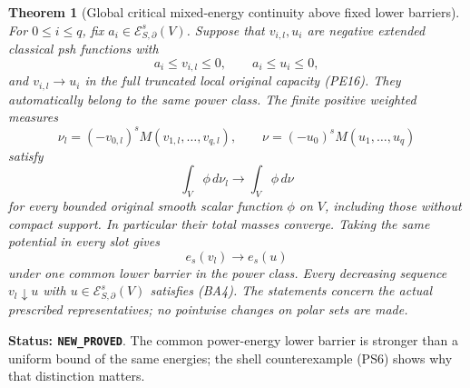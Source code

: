 \documentclass[11pt,a4paper]{article}
\numberwithin{equation}{section}
\newtheorem{theorem}{Theorem}[section]
\theoremstyle{definition}
\theoremstyle{remark}
\begin{document}
\begin{theorem}[Global critical mixed-energy continuity above fixed lower barriers]
\label{thm:r11-critical-energy-barrier-continuity}
For $0\leq i\leq q$, fix
$a_i\in\mathcal E^s_{S,\partial}(V)$. Suppose that
$v_{i,l},u_i$ are negative extended classical psh functions with
\[
                    a_i\leq v_{i,l}\leq0,
                    \qquad a_i\leq u_i\leq0,
 \tag{BA2}
\]
and $v_{i,l}\to u_i$ in the full truncated local original
capacity (PE16). They automatically belong to the same power
class. The finite positive weighted measures
\[
 \nu_l=(-v_{0,l})^s M(v_{1,l},\ldots,v_{q,l}),\qquad
 \nu=(-u_0)^s M(u_1,\ldots,u_q)
\]
satisfy
\[
                         \int_V\phi\,d\nu_l
                              \longrightarrow\int_V\phi\,d\nu
 \tag{BA3}
\]
for every bounded original smooth scalar function $\phi$ on $V$,
including those without compact support. In particular their
total masses converge. Taking the same potential in every slot
gives
\[
                              e_s(v_l)\longrightarrow e_s(u)
 \tag{BA4}
\]
under one common lower barrier in the power class.
Every decreasing sequence $v_l\downarrow u$ with
$u\in\mathcal E^s_{S,\partial}(V)$ satisfies (BA4).
The statements concern the actual prescribed representatives;
no pointwise changes on polar sets are made.
\end{theorem}

\noindent\textbf{Status: \texttt{NEW\_PROVED}}. The common
power-energy lower barrier is stronger than a uniform bound of
the same energies; the shell counterexample (PS6) shows why
that distinction matters.
\end{document}
